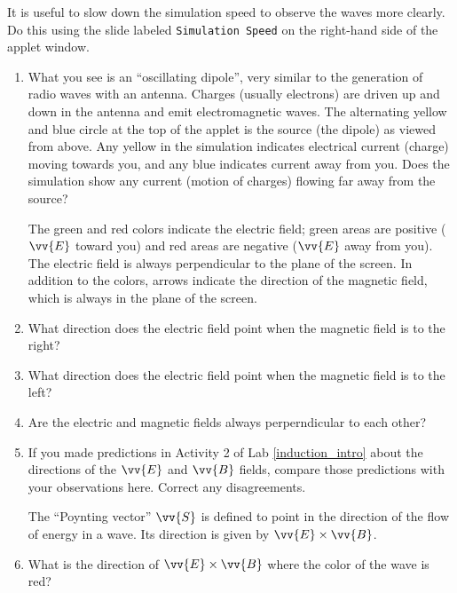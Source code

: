 \vspace{-0.2in}

It is useful to slow down the simulation speed to observe the waves more clearly.
Do this using the slide labeled
\texttt{Simulation Speed} on the right-hand side of the applet window.

\begin{enumerate}[labparts]

\item What you see is an ``oscillating dipole'', very similar to the generation of radio waves with an antenna.
Charges (usually electrons) are driven up and down in the antenna and emit electromagnetic 
waves.  
The alternating yellow and blue circle at the top of the applet is the source (the dipole)
as viewed from above.  Any yellow in the simulation indicates electrical current (charge) moving towards you, and any blue indicates current away from you.  Does the simulation show any current (motion of charges) flowing far away from the source?
\answerspace{1.0cm}

\pagebreak[2]
The green and red colors indicate the electric field; green areas are positive 
($\vv{E}$ toward you) and red areas are negative ($\vv{E}$ away from you). 
The electric field is always perpendicular to the plane of the screen.
In addition to the colors, arrows indicate the 
direction of the magnetic field, which is always in the plane of the screen.  

\item What direction does the electric field point when the magnetic field is to the right?
\answerspace{0.6cm}

\item What direction does the electric field point when the magnetic field is to the left?
\answerspace{0.6cm}

\item Are the electric and magnetic fields always perperndicular to each other?
\answerspace{0.6cm}

\item If you made predictions in Activity 2 of Lab \ref{induction_intro} about the directions of the $\vv {E}$ 
and $\vv {B}$ fields, compare those predictions with your observations here. Correct any disagreements.
\answerspace{2.0cm}

The ``Poynting vector'' $\vv{S}$ is defined to point in the direction of the flow of energy in a wave. Its direction is given by $\vv {E} \times \vv {B}$.  

\item What is the direction of $\vv {E}\times \vv {B}$ where the color of the wave is red?
\answerspace{1.0cm}


\end{enumerate}
